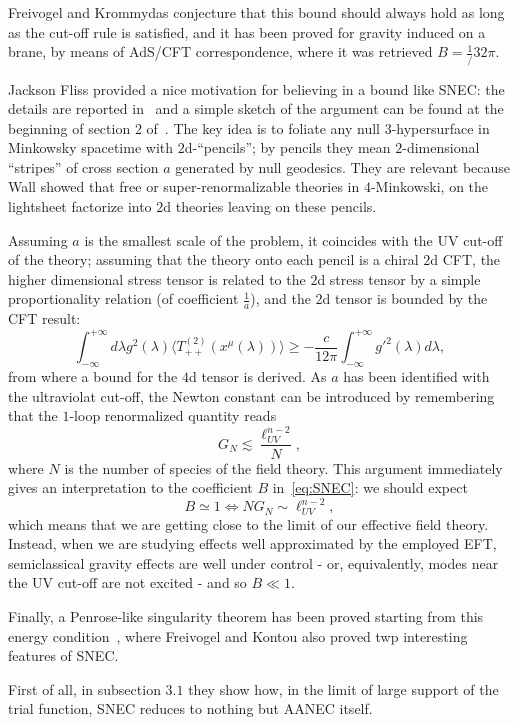 Freivogel and Krommydas conjecture that this bound should always hold as long as the cut-off rule is satisfied, and it has been proved for gravity induced on a brane, by means of AdS/CFT correspondence, where it was retrieved \(B = \frac{1}/{32\pi}\).

Jackson Fliss provided a nice motivation for believing in a bound like SNEC: the details are reported in~\cite[]{fliss2022semi} and a simple sketch of the argument can be found at the beginning of section \(2\) of~\cite[]{freivogel2020return}. The key idea is to foliate any null \(3\)-hypersurface in Minkowsky spacetime with \(2\)d-``pencils''; by pencils they mean \(2\)-dimensional ``stripes'' of cross section \(a\) generated by null geodesics. They are relevant because Wall showed that free or super-renormalizable theories in \(4\)-Minkowski, on the lightsheet factorize into \(2\)d theories leaving on these pencils.

Assuming \(a\) is the smallest scale of the problem, it coincides with the UV cut-off of the theory; assuming that the theory onto each pencil is a chiral \(2\)d CFT, the higher dimensional stress tensor is related to the \(2\)d stress tensor by a simple proportionality relation (of coefficient \(\frac{1}{a}\)), and the \(2\)d tensor is bounded by the CFT result:
\[
    \int_{-\infty}^{+\infty} d\lambda g^2(\lambda) \langle T^{(2)}_{++}(x^{\mu}(\lambda))\rangle \ge -\frac{c}{12\pi}\int_{-\infty}^{+\infty} g'^2(\lambda) d\lambda,
\]
from where a bound for the \(4\)d tensor is derived.
As \(a\) has been identified with the ultraviolat cut-off, the Newton constant can be introduced by remembering that the \(1\)-loop renormalized quantity reads
\[
G_N \lesssim \frac{\ell_{UV}^{n - 2}}{N},    
\]
where \(N\) is the number of species of the field theory.
This argument immediately gives an interpretation to the coefficient \(B\) in~\eqref{eq:SNEC}: we should expect
\[
B \simeq 1 \iff NG_N \sim  \ell_{UV}^{n - 2},  
\]
which means that we are getting close to the limit of our effective field theory. Instead, when we are studying effects well approximated by the employed EFT, semiclassical gravity effects are well under control - or, equivalently, modes near the UV cut-off are not excited - and so \(B \ll 1\).

Finally, a Penrose-like singularity theorem has been proved starting from this energy condition~\cite[]{freivogel2020return}, where Freivogel and Kontou also proved twp interesting features of SNEC. 

First of all, in subsection \(3.1\) they show how, in the limit of large support of the trial function, SNEC reduces to nothing but AANEC itself.

